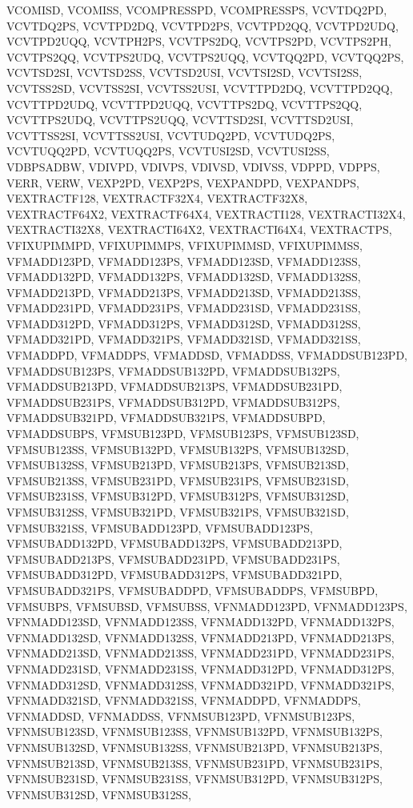 {{VCOMISD, VCOMISS, VCOMPRESSPD, VCOMPRESSPS, VCVTDQ2PD, VCVTDQ2PS, VCVTPD2DQ,
VCVTPD2PS, VCVTPD2QQ, VCVTPD2UDQ, VCVTPD2UQQ, VCVTPH2PS, VCVTPS2DQ, VCVTPS2PD,
VCVTPS2PH, VCVTPS2QQ, VCVTPS2UDQ, VCVTPS2UQQ, VCVTQQ2PD, VCVTQQ2PS, VCVTSD2SI,
VCVTSD2SS, VCVTSD2USI, VCVTSI2SD, VCVTSI2SS, VCVTSS2SD, VCVTSS2SI, VCVTSS2USI,
VCVTTPD2DQ, VCVTTPD2QQ, VCVTTPD2UDQ, VCVTTPD2UQQ, VCVTTPS2DQ, VCVTTPS2QQ,
VCVTTPS2UDQ, VCVTTPS2UQQ, VCVTTSD2SI, VCVTTSD2USI, VCVTTSS2SI, VCVTTSS2USI,
VCVTUDQ2PD, VCVTUDQ2PS, VCVTUQQ2PD, VCVTUQQ2PS, VCVTUSI2SD, VCVTUSI2SS,
VDBPSADBW, VDIVPD, VDIVPS, VDIVSD, VDIVSS, VDPPD, VDPPS, VERR, VERW, VEXP2PD,
VEXP2PS, VEXPANDPD, VEXPANDPS, VEXTRACTF128, VEXTRACTF32X4, VEXTRACTF32X8,
VEXTRACTF64X2, VEXTRACTF64X4, VEXTRACTI128, VEXTRACTI32X4, VEXTRACTI32X8,
VEXTRACTI64X2, VEXTRACTI64X4, VEXTRACTPS, VFIXUPIMMPD, VFIXUPIMMPS, VFIXUPIMMSD,
VFIXUPIMMSS, VFMADD123PD, VFMADD123PS, VFMADD123SD, VFMADD123SS, VFMADD132PD,
VFMADD132PS, VFMADD132SD, VFMADD132SS, VFMADD213PD, VFMADD213PS, VFMADD213SD,
VFMADD213SS, VFMADD231PD, VFMADD231PS, VFMADD231SD, VFMADD231SS, VFMADD312PD,
VFMADD312PS, VFMADD312SD, VFMADD312SS, VFMADD321PD, VFMADD321PS, VFMADD321SD,
VFMADD321SS, VFMADDPD, VFMADDPS, VFMADDSD, VFMADDSS, VFMADDSUB123PD,
VFMADDSUB123PS, VFMADDSUB132PD, VFMADDSUB132PS, VFMADDSUB213PD, VFMADDSUB213PS,
VFMADDSUB231PD, VFMADDSUB231PS, VFMADDSUB312PD, VFMADDSUB312PS, VFMADDSUB321PD,
VFMADDSUB321PS, VFMADDSUBPD, VFMADDSUBPS, VFMSUB123PD, VFMSUB123PS, VFMSUB123SD,
VFMSUB123SS, VFMSUB132PD, VFMSUB132PS, VFMSUB132SD, VFMSUB132SS, VFMSUB213PD,
VFMSUB213PS, VFMSUB213SD, VFMSUB213SS, VFMSUB231PD, VFMSUB231PS, VFMSUB231SD,
VFMSUB231SS, VFMSUB312PD, VFMSUB312PS, VFMSUB312SD, VFMSUB312SS, VFMSUB321PD,
VFMSUB321PS, VFMSUB321SD, VFMSUB321SS, VFMSUBADD123PD, VFMSUBADD123PS,
VFMSUBADD132PD, VFMSUBADD132PS, VFMSUBADD213PD, VFMSUBADD213PS, VFMSUBADD231PD,
VFMSUBADD231PS, VFMSUBADD312PD, VFMSUBADD312PS, VFMSUBADD321PD, VFMSUBADD321PS,
VFMSUBADDPD, VFMSUBADDPS, VFMSUBPD, VFMSUBPS, VFMSUBSD, VFMSUBSS, VFNMADD123PD,
VFNMADD123PS, VFNMADD123SD, VFNMADD123SS, VFNMADD132PD, VFNMADD132PS,
VFNMADD132SD, VFNMADD132SS, VFNMADD213PD, VFNMADD213PS, VFNMADD213SD,
VFNMADD213SS, VFNMADD231PD, VFNMADD231PS, VFNMADD231SD, VFNMADD231SS,
VFNMADD312PD, VFNMADD312PS, VFNMADD312SD, VFNMADD312SS, VFNMADD321PD,
VFNMADD321PS, VFNMADD321SD, VFNMADD321SS, VFNMADDPD, VFNMADDPS, VFNMADDSD,
VFNMADDSS, VFNMSUB123PD, VFNMSUB123PS, VFNMSUB123SD, VFNMSUB123SS, VFNMSUB132PD,
VFNMSUB132PS, VFNMSUB132SD, VFNMSUB132SS, VFNMSUB213PD, VFNMSUB213PS,
VFNMSUB213SD, VFNMSUB213SS, VFNMSUB231PD, VFNMSUB231PS, VFNMSUB231SD,
VFNMSUB231SS, VFNMSUB312PD, VFNMSUB312PS, VFNMSUB312SD, VFNMSUB312SS,
}}
